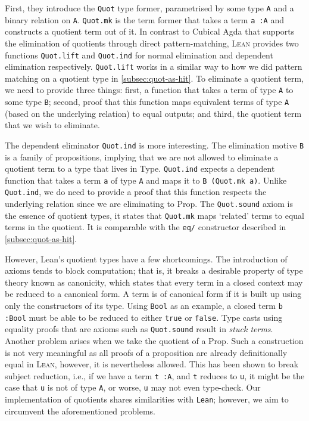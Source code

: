 \documentclass[12pt,twoside,maitrise]{dms}
\theoremstyle{definition}
\numberwithin{equation}{section}
\numberwithin{table}{chapter}
\numberwithin{figure}{chapter}
\newcommand\kw[1] {\textsf{#1}}
\newcommand\id[1] {\texttt{#1}}
\newcommand\fn[1] {\texttt{#1}}
\def\Lean{\textsc{Lean}\xspace}
\begin{document}
First, they introduce the \id{Quot} type former, parametrised by some type
\id{A} and a binary relation on \id{A}. \id{Quot.mk} is the term former that
takes a term \fn{a :\@ A} and constructs a quotient term out of it. In contrast
to Cubical Agda that supports the elimination of quotients through direct
pattern-matching, \Lean{} provides two functions \id{Quot.lift} and
\id{Quot.ind} for normal elimination and dependent elimination respectively.
\id{Quot.lift} works in a similar way to how we did pattern matching on a
quotient type in \autoref{subsec:quot-as-hit}. To eliminate a quotient term, we
need to provide three things: first, a function that takes a term of type
\id{A} to some type \id{B}; second, proof that this function maps equivalent
terms of type \id{A} (based on the underlying relation) to equal outputs; and
third, the quotient term that we wish to eliminate.

The dependent eliminator \id{Quot.ind} is more interesting. The elimination
motive \id{B} is a family of propositions, implying that we are not allowed to
eliminate a quotient term to a type that lives in \kw{Type}. \id{Quot.ind}
expects a dependent function that takes a term \id{a} of type \id{A} and maps
it to \fn{B (Quot.mk a)}. Unlike \id{Quot.ind}, we do need to provide a proof
that this function respects the underlying relation since we are eliminating to
\kw{Prop}. The \id{Quot.sound} axiom is the essence of quotient types, it
states that \id{Quot.mk} maps `related' terms to equal terms in the quotient.
It is comparable with the \id{eq/} constructor described in
\autoref{subsec:quot-as-hit}.

However, Lean's quotient types have a few shortcomings. The introduction of
axioms tends to block computation; that is, it breaks a desirable property of
type theory known as canonicity\cite{hofmann1995extensional}, which states that
every term in a closed context may be reduced to a canonical form. A term is of
canonical form if it is built up using only the constructors of its type. Using
\id{Bool} as an example, a closed term \fn{b :\@ Bool} must be able to be
reduced to either \id{true} or \id{false}. Type casts using equality proofs
that are axioms such as \id{Quot.sound} result in \emph{stuck terms}. Another
problem arises when we take the quotient of a \kw{Prop}. Such a construction is
not very meaningful as all proofs of a proposition are already definitionally
equal in \Lean{}, however, it is nevertheless allowed. This has been shown to
break subject reduction\cite{carneiro-lean-type-theory}, i.e., if we have a
term \fn{t :\@ A}, and \id{t} reduces to \id{u}, it might be the case that
\id{u} is not of type \id{A}, or worse, \id{u} may not even type-check. Our
implementation of quotients shares similarities with \id{Lean}; however, we aim
to circumvent the aforementioned problems.
\end{document}
